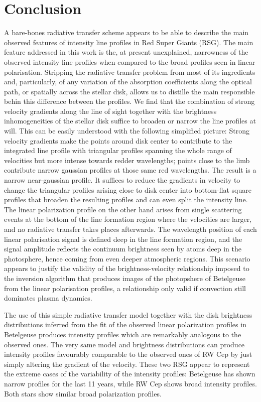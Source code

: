 \documentclass{/Users/art2/TeX/aanda/aa}
\begin{document}
\section{Conclusion}

A bare-bones radiative transfer scheme appears to be able to describe the main observed features of intensity line profiles in Red Super Giants (RSG). 
The main feature addressed in this work is the, at present unexplained, narrowness of the observed intensity line profiles when compared to the 
broad profiles seen in linear polarisation.  
Stripping the radiative transfer problem from most of its ingredients and, particularly, of any variation of the absorption coefficients 
along the optical path, or spatially across the stellar disk, allows us to distille the main responsible behin this difference between the profiles.
 We find 
that the combination of strong velocity gradients along the line of sight together with the brightness inhomogeneities of the stellar disk suffice 
to broaden or narrow the line profiles at will.  This can be easily understood with the following simplified picture: Strong velocity gradients make
 the points around disk center to contribute to the integrated 
line profile with triangular profiles spanning the whole range of velocities but more intense towards redder wavelengths; points close to the limb 
contribute 
narrow gaussian profiles at those same red wavelengths. The result is a narrow near-gaussian profile. It suffices to reduce the gradients in velocity 
to change the triangular profiles arising close to disk center into bottom-flat square profiles that broaden the resulting profiles and can even 
split the intensity line. The linear polarization profile on the other hand arises from single scattering events at the bottom of the line formation 
region where the velocities are larger, and no radiative transfer takes places afterwards. The wavelength position of each linear polarisation signal 
is defined deep in the line formation region, and the signal amplitude reflects the continuum brightness seen by atoms deep in the photosphere, hence 
coming from even deeper atmospheric regions. This scenario appears to justify the validity of the brightness-velocity relationship imposed to the 
inversion algorithm that produces images of the photopshere of Betelgeuse from the linear polarisation profiles, a relationship only valid if convection 
still dominates plasma dynamics.

The use of this simple radiative transfer model together with the disk brightness distributions inferred from the fit of the observed 
linear polarization profiles in Betelgeuse produces intensity profiles which are remarkably analogous to the observed ones. The very same model and 
brightness distributions can produce intensity profiles favourably comparable to the observed ones of RW Cep by just simply altering the gradient 
of the velocity. These two RSG appear to represent the extreme cases of the variability of the intensity profiles: Betelgeuse has shown narrow profiles 
for the last 11 years, while RW Cep shows broad intensity profiles. Both stars show similar broad polarization profiles.
\end{document}
